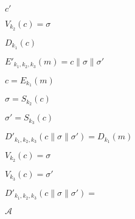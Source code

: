 \documentclass[10pt]{book}
\begin{document}
\begin{mdSnippets}
\begin{mdInlineSnippet}[12c7acffa10294560a339fa9f4796b80]%
$c'$\end{mdInlineSnippet}%
\begin{mdInlineSnippet}%
$V_{k_2}(c) = \sigma$\end{mdInlineSnippet}%
\begin{mdInlineSnippet}[5ca38eb818d43697a927adffbcfdb0fe]%
$D_{k_1}(c)$\end{mdInlineSnippet}%
\begin{mdInlineSnippet}[dc5d1ef97ba9f111102b69f35e1a3b2d]%
$E'_{k_1,k_2,k_3}(m) = c\|\sigma\|\sigma'$\end{mdInlineSnippet}%
\begin{mdInlineSnippet}%
$c=E_{k_1}(m)$\end{mdInlineSnippet}%
\begin{mdInlineSnippet}[c166f30e21d90159f3d73e2b6a44a225]%
$\sigma=S_{k_2}(c)$\end{mdInlineSnippet}%
\begin{mdInlineSnippet}[944a3a7552a7c2dd09c95c2de5045fe7]%
$\sigma'=S_{k_3}(c)$\end{mdInlineSnippet}%
\begin{mdInlineSnippet}[5f3759e058e65d2a01427d967a1021ad]%
$D'_{k_1,k_2,k_3}(c\|\sigma\|\sigma')=D_{k_1}(m)$\end{mdInlineSnippet}%
\begin{mdInlineSnippet}%
$V_{k_2}(c)=\sigma$\end{mdInlineSnippet}%
\begin{mdInlineSnippet}[73c9ec4c45c3942c02cf50d63e28eeb8]%
$V_{k_3}(c)=\sigma'$\end{mdInlineSnippet}%
\begin{mdInlineSnippet}[8f7f844c9b084b0e07dbca89f181868a]%
$D'_{k_1,k_2,k_3}(c\|\sigma\|\sigma')=$\end{mdInlineSnippet}%
\begin{mdInlineSnippet}[ad70146b431bea9ae74cf8385470c544]%
$\mathcal{A}$\end{mdInlineSnippet}%
\begin{mdInlineSnippet}%

\end{mdInlineSnippet}
\end{mdSnippets}
\end{document}
